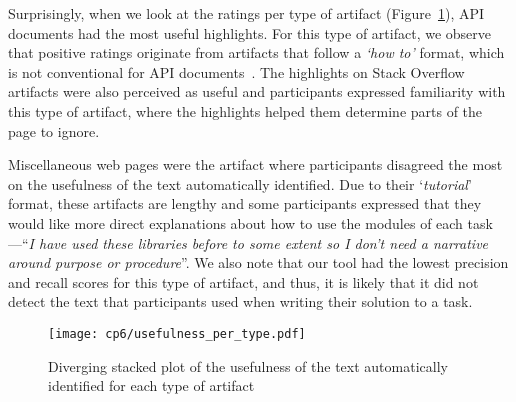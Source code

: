 Surprisingly, when we look at the ratings per type of artifact (Figure~\ref{fig:usefulness-by-artifact-type}), API documents had the most useful highlights.
For this type of artifact, we observe that positive ratings originate from artifacts that follow a \textit{`how to'} format,
which is not conventional for API documents~\cite{robillard2011field, arya2020}. The highlights on Stack Overflow artifacts were also perceived as useful
and participants expressed familiarity with this type of artifact, where the highlights helped them determine parts of the page to ignore.


Miscellaneous web pages were the artifact where participants disagreed the most on the usefulness of the text automatically identified.
Due to their `\textit{tutorial}' format, these artifacts are lengthy and some participants expressed that they would like more direct explanations about how to use the modules of each task---``\textit{I have used these libraries before to some extent so I don't need a narrative around purpose or procedure}''. We also note that our tool had the lowest precision and recall scores for this type of artifact, and thus, it is likely that it did not detect the text that participants used when writing their solution to a task.





\begin{figure}
    \centering
    \texttt{[image: cp6/usefulness\_per\_type.pdf]}
    \caption{Diverging stacked plot of the usefulness of the text automatically identified for each type of artifact}
    \label{fig:usefulness-by-artifact-type}
\end{figure}
























